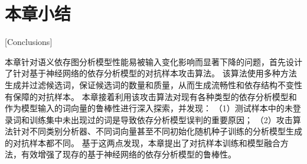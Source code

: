 \section{本章小结}[Conclusions]

本章针对语义依存图分析模型性能易被输入变化影响而显著下降的问题，首先设计了针对基于神经网络的依存分析模型的对抗样本攻击算法。
该算法使用多种方法生成并过滤候选词，保证候选词的数量和质量，从而生成流畅性和依存结构不变性有保障的对抗样本。
本章接着利用该攻击算法对现有各种类型的依存分析模型和作为模型输入的词向量的鲁棒性进行深入探索，并发现：
（1）测试样本中的未登录词和训练集中未出现过的词是导致依存分析模型误判的重要原因；
（2）攻击算法针对不同类别分析器、不同词向量甚至不同初始化随机种子训练的分析模型生成的对抗样本都不同。
基于这两点发现，本章提出了对抗样本训练和模型融合方法，有效增强了现存的基于神经网络的依存分析模型的鲁棒性。


